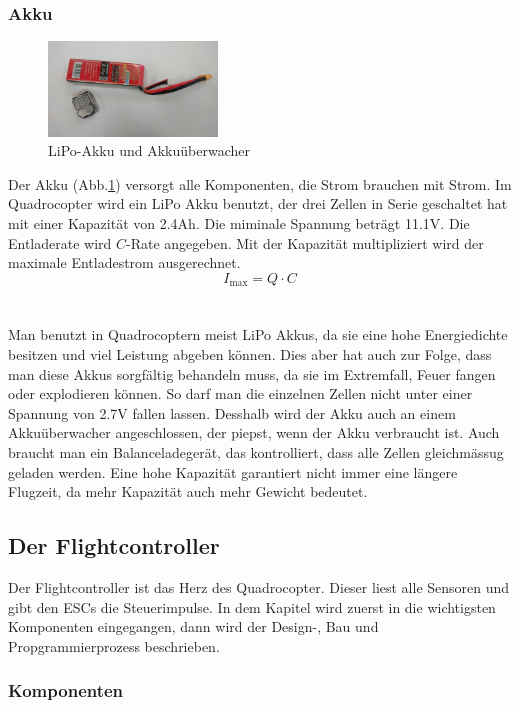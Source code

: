 \documentclass[12pt,a4paper, ngerman]{article}
\begin{document}
\subsubsection{Akku}
\begin{figure}
\centering
\includegraphics[width=0.4\textwidth]{accu.jpg}
\caption[Eigenes Bild]{LiPo-Akku und Akkuüberwacher} \label{accu}
\end{figure}
Der Akku (Abb.\ref{accu}) versorgt alle Komponenten, die Strom brauchen mit Strom. Im Quadrocopter wird ein LiPo Akku benutzt, der drei Zellen in Serie geschaltet hat mit einer Kapazität von 2.4Ah. Die miminale Spannung beträgt 11.1V. Die Entladerate wird $C$-Rate angegeben. Mit der Kapazität multipliziert wird der maximale Entladestrom ausgerechnet.\cite{website:fpvracing.ch_Mult_Komp}
\begin{equation}
I_{\text{max}}=Q\cdot C
\end{equation}\\ \\
Man benutzt in Quadrocoptern meist LiPo Akkus, da sie eine hohe Energiedichte besitzen und viel Leistung abgeben können. Dies aber hat auch zur Folge, dass man diese Akkus sorgfältig behandeln muss, da sie im Extremfall, Feuer fangen oder explodieren können. So darf man die einzelnen Zellen nicht unter einer Spannung von 2.7V fallen lassen. Desshalb wird der Akku auch an einem Akkuüberwacher angeschlossen, der piepst, wenn der Akku verbraucht ist. Auch braucht man ein Balanceladegerät, das kontrolliert, dass alle Zellen gleichmässug geladen werden. Eine hohe Kapazität garantiert nicht immer eine längere Flugzeit, da mehr Kapazität auch mehr Gewicht bedeutet.\cite{website:fpvracing.ch_Mult_Komp}
\newpage

\subsection{Der Flightcontroller}
Der Flightcontroller ist das Herz des Quadrocopter. Dieser liest alle Sensoren und gibt den ESCs die Steuerimpulse. In dem Kapitel wird zuerst in die wichtigsten Komponenten eingegangen, dann wird der Design-, Bau und Propgrammierprozess beschrieben.
\subsubsection{Komponenten}
\end{document}
